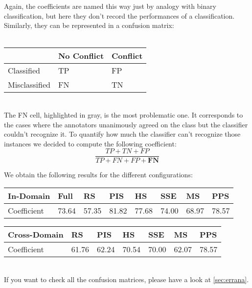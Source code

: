 Again, the coefficients are named this way just by analogy with binary classification, but here they don't record the performances of a classification. Similarly, they can be represented in a confusion matrix:
\\
\\
\begin{table}[H]
\centering
\begin{tabular}{|l|l|l|}
\hline
              & No Conflict                & Conflict \\ \hline
Classified    & TP                         & FP       \\ \hline
Misclassified & \cellcolor[HTML]{9B9B9B}FN & TN       \\ \hline
\end{tabular}
\end{table}
\\

The FN cell, highlighted in gray, is the most problematic one. It corresponds to the cases where the annotators unanimously agreed on the class but the classifier couldn’t recognize it. To quantify how much the classifier can't recognize those instances we decided to compute the following coefficient:
\begin{equation*}
\frac{TP + TN + FP}{TP + FN + FP + \textbf{FN}}
\end{equation*}

We obtain the following results for the different configurations:
\begin{table}[h]
\centering
\begin{tabular}{|l|l|l|l|l|l|l|l|}
\hline
In-Domain   & Full  & RS    & PIS   & HS    & SSE   & MS    & PPS   \\ \hline
Coefficient & 73.64 & 57.35 & 81.82 & 77.68 & 74.00 & 68.97 & 78.57 \\ \hline
\end{tabular}
\end{table}
\begin{table}[h]
\centering
\begin{tabular}{|l|l|l|l|l|l|l|}
\hline
Cross-Domain & RS    & PIS   & HS    & SSE   & MS    & PPS   \\ \hline
Coefficient  & 61.76 & 62.24 & 70.54 & 70.00 & 62.07 & 78.57 \\ \hline
\end{tabular}
\end{table}
\\
If you want to check all the confusion matrices, please have a look at \cref{sec:errana}.

